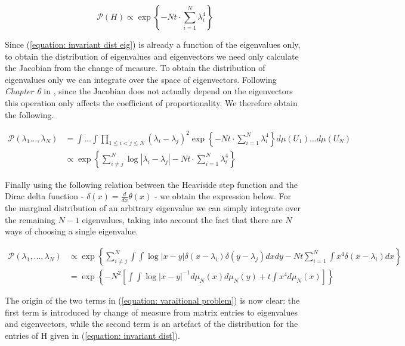 \documentclass{article}
\begin{document}
\begin{equation}
	\mathcal{P} \left( H \right) \propto \exp \left \{ - Nt \cdot \sum_{i=1}^N \lambda_i^4 \right \}
	\label{equation: invariant dist eig}
\end{equation}

Since (\ref{equation: invariant dist eig}) is already a function of the eigenvalues only, to obtain the distribution of eigenvalues and eigenvectors we need only calculate the Jacobian from the change of measure. To obtain the distribution of eigenvalues only we can integrate over the space of eigenvectors. Following \textit{Chapter 6} in \cite{deift1999orthogonal}, since the Jacobian does not actually depend on the eigenvectors this operation only affects the coefficient of proportionality. We therefore obtain the following. 

\begin{align}
	\mathcal{P} \left ( \lambda_1 \dots, \lambda_N \right ) & = \int \dots \int \prod_{1\leq i < j \leq N} \left ( \lambda_i - \lambda_j \right )^2 \exp \left \{ - Nt \cdot \sum_{i=1}^N \lambda_i^4 \right \} d \mu (U_1) \dots d \mu (U_N) \\ 
	& \propto \exp \left \{ \sum_{i \neq j}^N \log \left | \lambda_i - \lambda_j \right | - Nt \cdot \sum_{i=1}^N \lambda_i^4 \right \} 
	\label{equation: eigen decomp dist}
\end{align}

Finally using the following relation between the Heaviside step function and the Dirac delta function - $\delta (x) = \frac{d}{dx}  \theta (x)$ - we obtain the expression below. For the marginal distribution of an arbitrary eigenvalue we can simply integrate over the remaining $N-1$ eigenvalues, taking into account the fact that there are $N$ ways of choosing a single eigenvalue.

\begin{align}
	\mathcal{P} \left( \lambda_1, \dots, \lambda_N \right ) & \propto \exp \left \{ \sum_{i \neq j}^N \int \int \log | x-y| \delta(x - \lambda_i) \delta(y - \lambda_j) dx dy - Nt \sum_{i=1}^N \int x^4 \delta (x - \lambda_i) dx  \right \} \\ 
	& = \exp \left \{ -N^2 \left [ \int \int \log |x-y|^{-1} d \mu_N (x) d \mu_N (y) + t \int x^4 d \mu_N (x) \right ] \right \}
\end{align} 

The origin of the two terms in (\ref{equation: varaitional problem}) is now clear: the first term is introduced by change of measure from matrix entries to eigenvalues and eigenvectors, while the second term is an artefact of the distribution for the entries of H given in (\ref{equation: invariant dist}). 
\end{document}
